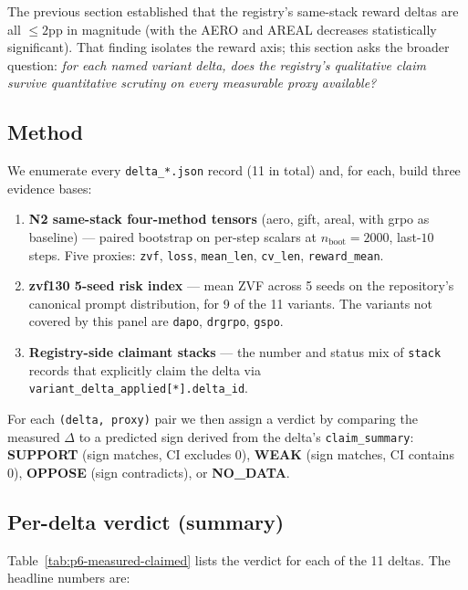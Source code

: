 \documentclass{article}
\begin{document}
The previous section established that the registry's same-stack reward
deltas are all $\leq 2$pp in magnitude (with the AERO and AREAL
decreases statistically significant). That finding isolates the
reward axis; this section asks the broader question: \emph{for each
named variant delta, does the registry's qualitative claim survive
quantitative scrutiny on every measurable proxy available?}

\subsection{Method}
We enumerate every \texttt{delta\_*.json} record (11 in total) and, for
each, build three evidence bases:
\begin{enumerate}
  \item \textbf{N2 same-stack four-method tensors} (aero, gift, areal,
    with grpo as baseline) --- paired bootstrap on per-step scalars at
    $n_{\text{boot}}{=}2000$, last-$10$ steps. Five proxies:
    \texttt{zvf}, \texttt{loss}, \texttt{mean\_len}, \texttt{cv\_len},
    \texttt{reward\_mean}.
  \item \textbf{zvf130 5-seed risk index} --- mean ZVF across 5 seeds
    on the repository's canonical prompt distribution, for 9 of the 11
    variants. The variants not covered by this panel are
    \texttt{dapo}, \texttt{drgrpo}, \texttt{gspo}.
  \item \textbf{Registry-side claimant stacks} --- the number and status
    mix of \texttt{stack} records that explicitly claim the delta via
    \texttt{variant\_delta\_applied[*].delta\_id}.
\end{enumerate}
For each \texttt{(delta, proxy)} pair we then assign a verdict by
comparing the measured $\Delta$ to a predicted sign derived from the
delta's \texttt{claim\_summary}:
\textbf{SUPPORT} (sign matches, CI excludes 0), \textbf{WEAK} (sign
matches, CI contains 0), \textbf{OPPOSE} (sign contradicts), or
\textbf{NO\_DATA}.

\subsection{Per-delta verdict (summary)}
Table~\ref{tab:p6-measured-claimed} lists the verdict for each of the
11 deltas. The headline numbers are:
\end{document}
